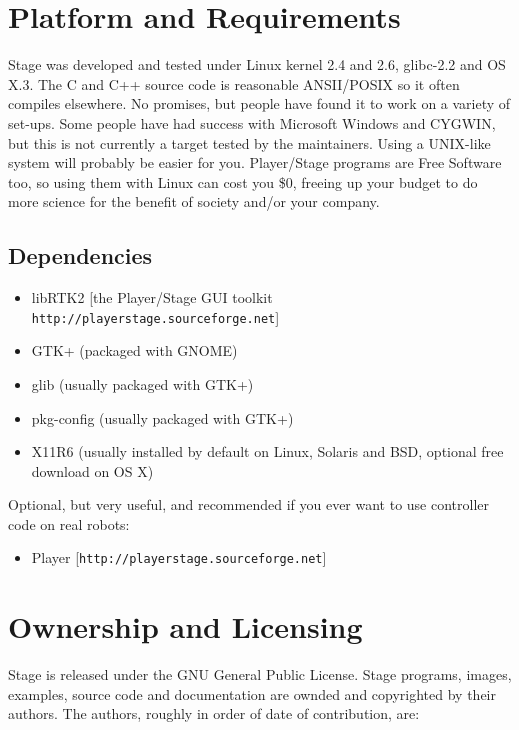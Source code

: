 \documentclass[letter,11pt,twoside]{report}
\def\HOMEPAGE {{\tt http://playerstage.sourceforge.net}}
\begin{document}
\section{Platform and Requirements}

Stage was developed and tested under Linux kernel 2.4 and 2.6,
glibc-2.2 and OS X.3. The C and C++ source code is reasonable
ANSII/POSIX so it often compiles elsewhere. No promises, but people
have found it to work on a variety of set-ups. Some people have had
success with Microsoft Windows and CYGWIN, but this is not currently a
target tested by the maintainers. Using a UNIX-like system will
probably be easier for you. Player/Stage programs are Free Software
too, so using them with Linux can cost you \$0, freeing up your budget
to do more science for the benefit of society and/or your company.

\subsection{Dependencies}

\begin{itemize}
\item libRTK2 [the Player/Stage GUI toolkit \HOMEPAGE] 
\item GTK+ (packaged with GNOME)
\item glib (usually packaged with GTK+)
\item pkg-config (usually packaged with GTK+)
\item X11R6 (usually installed by default on Linux, Solaris and BSD,
  optional free download on OS X)
\end{itemize}

Optional, but very useful, and recommended if you ever want to use
controller code on real robots:
\begin{itemize}
\item Player [\HOMEPAGE]
\end{itemize}

\section{Ownership and Licensing}

Stage is released under the GNU General Public License. Stage
programs, images, examples, source code and documentation are ownded
and copyrighted by their authors. The authors, roughly in order of
date of contribution, are:
\end{document}
